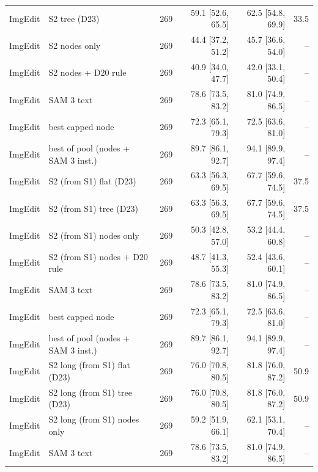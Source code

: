 \begin{tabular}{llrrrr}
ImgEdit & S2 tree (D23) & 269 & 59.1 \scriptsize{[52.6, 65.5]} & 62.5 \scriptsize{[54.8, 69.9]} & 33.5 \\
ImgEdit & S2 nodes only & 269 & 44.4 \scriptsize{[37.2, 51.2]} & 45.7 \scriptsize{[36.6, 54.0]} & -- \\
ImgEdit & S2 nodes + D20 rule & 269 & 40.9 \scriptsize{[34.0, 47.7]} & 42.0 \scriptsize{[33.1, 50.4]} & -- \\
ImgEdit & SAM 3 text & 269 & 78.6 \scriptsize{[73.5, 83.2]} & 81.0 \scriptsize{[74.9, 86.5]} & -- \\
ImgEdit & best capped node & 269 & 72.3 \scriptsize{[65.1, 79.3]} & 72.5 \scriptsize{[63.6, 81.0]} & -- \\
ImgEdit & best of pool (nodes + SAM 3 inst.) & 269 & 89.7 \scriptsize{[86.1, 92.7]} & 94.1 \scriptsize{[89.9, 97.4]} & -- \\
\midrule
ImgEdit & S2 (from S1) flat (D23) & 269 & 63.3 \scriptsize{[56.3, 69.5]} & 67.7 \scriptsize{[59.6, 74.5]} & 37.5 \\
ImgEdit & S2 (from S1) tree (D23) & 269 & 63.3 \scriptsize{[56.3, 69.5]} & 67.7 \scriptsize{[59.6, 74.5]} & 37.5 \\
ImgEdit & S2 (from S1) nodes only & 269 & 50.3 \scriptsize{[42.8, 57.0]} & 53.2 \scriptsize{[44.4, 60.8]} & -- \\
ImgEdit & S2 (from S1) nodes + D20 rule & 269 & 48.7 \scriptsize{[41.3, 55.3]} & 52.4 \scriptsize{[43.6, 60.1]} & -- \\
ImgEdit & SAM 3 text & 269 & 78.6 \scriptsize{[73.5, 83.2]} & 81.0 \scriptsize{[74.9, 86.5]} & -- \\
ImgEdit & best capped node & 269 & 72.3 \scriptsize{[65.1, 79.3]} & 72.5 \scriptsize{[63.6, 81.0]} & -- \\
ImgEdit & best of pool (nodes + SAM 3 inst.) & 269 & 89.7 \scriptsize{[86.1, 92.7]} & 94.1 \scriptsize{[89.9, 97.4]} & -- \\
\midrule
ImgEdit & S2 long (from S1) flat (D23) & 269 & 76.0 \scriptsize{[70.8, 80.5]} & 81.8 \scriptsize{[76.0, 87.2]} & 50.9 \\
ImgEdit & S2 long (from S1) tree (D23) & 269 & 76.0 \scriptsize{[70.8, 80.5]} & 81.8 \scriptsize{[76.0, 87.2]} & 50.9 \\
ImgEdit & S2 long (from S1) nodes only & 269 & 59.2 \scriptsize{[51.9, 66.1]} & 62.1 \scriptsize{[53.1, 70.4]} & -- \\
ImgEdit & SAM 3 text & 269 & 78.6 \scriptsize{[73.5, 83.2]} & 81.0 \scriptsize{[74.9, 86.5]} & -- \\

\end{tabular}

